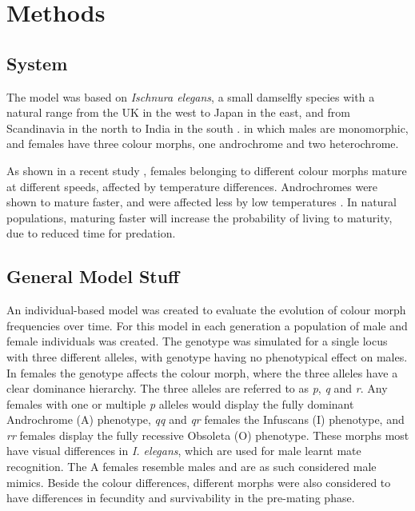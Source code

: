 \documentclass{article}
\begin{document}
\section{Methods}
\subsection{System}
The model was based on \textit{Ischnura elegans}, a small damselfly species with a natural range from the UK in the west to Japan in the east, and from Scandinavia in the north to India in the south \cite{IUCNisch}.
in which males are monomorphic, and females have three colour morphs, one androchrome and two heterochrome.


As shown in a recent study \cite{Svensson2019}, females belonging to different colour morphs mature at different speeds, affected by temperature differences. Androchromes were shown to mature faster, and were affected less by low temperatures \cite{Svensson2019}. In natural populations, maturing faster will increase the probability of living to maturity, due to reduced time for predation.

\subsection{General Model Stuff}
An individual-based model was created to evaluate the evolution of colour morph frequencies over time. For this model in each generation a population of male and female individuals was created. The genotype was simulated for a single locus with three different alleles, with genotype having no phenotypical effect on males. In females the genotype affects the colour morph, where the three alleles have a clear dominance hierarchy.  The three alleles are referred to as \textit{p}, \textit{q} and \textit{r}. Any females with one or multiple \textit{p} alleles would display the fully dominant Androchrome (A) phenotype, \textit{qq} and \textit{qr} females the Infuscans (I) phenotype, and \textit{rr} females display the fully recessive Obsoleta (O) phenotype. These morphs most have visual differences in \textit{I. elegans}, which are used for male learnt mate recognition. The A females resemble males and are as such considered male mimics. Beside the colour differences, different morphs were also considered to have differences in fecundity and survivability in the pre-mating phase.
\end{document}

